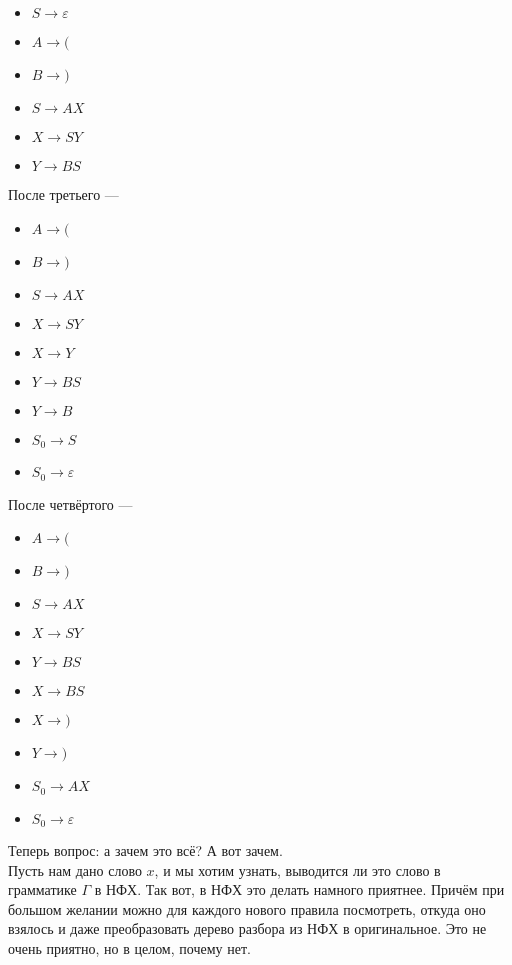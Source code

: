 \documentclass{article}
\begin{document}
\begin{itemize}
\begin{Example}
            \begin{itemize}
                \item $S\to\varepsilon$
                \item $A\to{(}$
                \item $B\to{)}$
                \item $S\to AX$
                \item $X\to SY$
                \item $Y\to BS$
            \end{itemize}
            После третьего ---
            \begin{itemize}
                \item $A\to{(}$
                \item $B\to{)}$
                \item $S\to AX$
                \item $X\to SY$
                \item $X\to Y$
                \item $Y\to BS$
                \item $Y\to B$
                \item $S_0\to S$
                \item $S_0\to\varepsilon$
            \end{itemize}
            После четвёртого ---
            \begin{itemize}
                \item $A\to{(}$
                \item $B\to{)}$
                \item $S\to AX$
                \item $X\to SY$
                \item $Y\to BS$
                \item $X\to BS$
                \item $X\to{)}$
                \item $Y\to{)}$
                \item $S_0\to AX$
                \item $S_0\to\varepsilon$
            \end{itemize}
        \end{Example}
        \begin{Comment}
            Теперь вопрос: а зачем это всё? А вот зачем.\\
            Пусть нам дано слово $x$, и мы хотим узнать, выводится ли это слово в грамматике $\Gamma$ в НФХ. Так вот, в НФХ это делать намного приятнее. Причём при большом желании можно для каждого нового правила посмотреть, откуда оно взялось и даже преобразовать дерево разбора из НФХ в оригинальное. Это не очень приятно, но в целом, почему нет.\\

\end{Comment}
\end{itemize}
\end{document}
